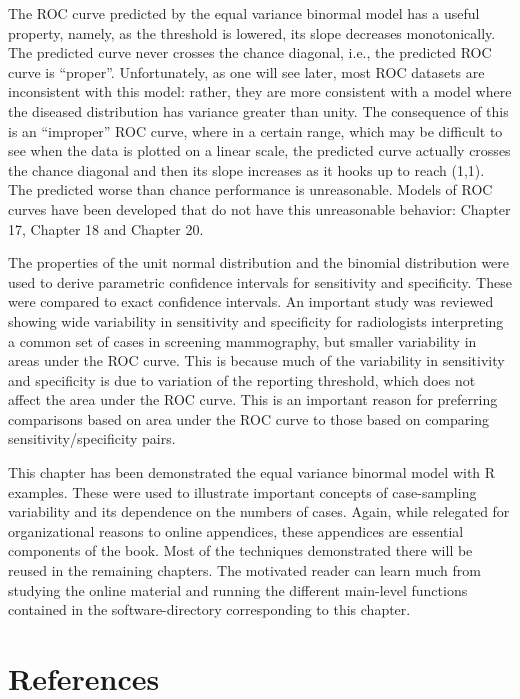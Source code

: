 \documentclass[
]{book}
\begin{document}
The ROC curve predicted by the equal variance binormal model has a useful property, namely, as the threshold is lowered, its slope decreases monotonically. The predicted curve never crosses the chance diagonal, i.e., the predicted ROC curve is ``proper''. Unfortunately, as one will see later, most ROC datasets are inconsistent with this model: rather, they are more consistent with a model where the diseased distribution has variance greater than unity. The consequence of this is an ``improper'' ROC curve, where in a certain range, which may be difficult to see when the data is plotted on a linear scale, the predicted curve actually crosses the chance diagonal and then its slope increases as it hooks up to reach (1,1). The predicted worse than chance performance is unreasonable. Models of ROC curves have been developed that do not have this unreasonable behavior: Chapter 17, Chapter 18 and Chapter 20.

The properties of the unit normal distribution and the binomial distribution were used to derive parametric confidence intervals for sensitivity and specificity. These were compared to exact confidence intervals. An important study was reviewed showing wide variability in sensitivity and specificity for radiologists interpreting a common set of cases in screening mammography, but smaller variability in areas under the ROC curve. This is because much of the variability in sensitivity and specificity is due to variation of the reporting threshold, which does not affect the area under the ROC curve. This is an important reason for preferring comparisons based on area under the ROC curve to those based on comparing sensitivity/specificity pairs.

This chapter has been demonstrated the equal variance binormal model with R examples. These were used to illustrate important concepts of case-sampling variability and its dependence on the numbers of cases. Again, while relegated for organizational reasons to online appendices, these appendices are essential components of the book. Most of the techniques demonstrated there will be reused in the remaining chapters. The motivated reader can learn much from studying the online material and running the different main-level functions contained in the software-directory corresponding to this chapter.

\hypertarget{binary-task-model-references}{%
\section{References}\label{binary-task-model-references}}
\end{document}
